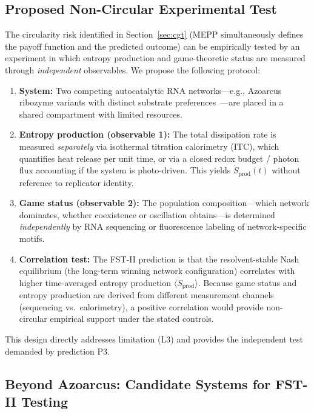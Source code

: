 \documentclass[12pt,a4paper]{article}
\theoremstyle{remark}
\begin{document}
\subsection{Proposed Non-Circular Experimental Test}
\label{sec:noncircular-test}

The circularity risk identified in Section~\ref{sec:cgt} (MEPP simultaneously defines the payoff function and the predicted outcome) can be empirically tested by an experiment in which entropy production and game-theoretic status are measured through \emph{independent} observables. We propose the following protocol:

\begin{enumerate}
    \item \textbf{System:} Two competing autocatalytic RNA networks---e.g., Azoarcus ribozyme variants with distinct substrate preferences~\citep{AzoarcusPMC}---are placed in a shared compartment with limited resources.
    \item \textbf{Entropy production (observable 1):} The total dissipation rate is measured \emph{separately} via isothermal titration calorimetry (ITC), which quantifies heat release per unit time, or via a closed redox budget / photon flux accounting if the system is photo-driven. This yields $\dot{S}_{\mathrm{prod}}(t)$ without reference to replicator identity.
    \item \textbf{Game status (observable 2):} The population composition---which network dominates, whether coexistence or oscillation obtains---is determined \emph{independently} by RNA sequencing or fluorescence labeling of network-specific motifs.
    \item \textbf{Correlation test:} The FST-II prediction is that the resolvent-stable Nash equilibrium (the long-term winning network configuration) correlates with higher time-averaged entropy production $\langle\dot{S}_{\mathrm{prod}}\rangle$. Because game status and entropy production are derived from different measurement channels (sequencing vs.\ calorimetry), a positive correlation would provide non-circular empirical support under the stated controls.
\end{enumerate}

\noindent
This design directly addresses limitation (L3) and provides the independent test demanded by prediction P3.

\subsection{Beyond Azoarcus: Candidate Systems for FST-II Testing}
\label{sec:beyond-azoarcus}
\end{document}
